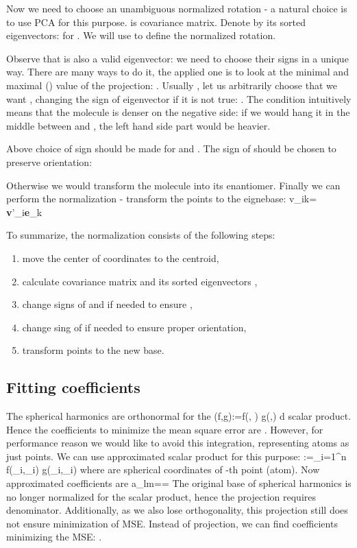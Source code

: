 \documentclass[10pt,journal]{IEEEtranTCOM}
\theoremstyle{plain}
\begin{document}
Now we need to choose an unambiguous normalized rotation - a natural choice is to use PCA for this purpose.  is  covariance matrix. Denote by  its sorted eigenvectors:  for . We will use  to define the normalized rotation.

Observe that  is also a valid eigenvector: we need to choose their signs in a unique way. There are many ways to do it, the applied one is to look at the minimal and maximal () value of the projection: . Usually , let us arbitrarily choose that we want , changing the sign of eigenvector if it is not true: . The  condition intuitively means that the molecule is denser on the negative side: if we would hang it in the middle between  and , the left hand side part would be heavier.

Above choice of sign should be made for  and . The sign of  should be chosen to preserve orientation:

Otherwise we would transform the molecule into its enantiomer. Finally we can perform the normalization - transform the points to the eignebase:
\be v_{ik}= \textbf{v}'_i\cdot \textbf{e}_k\ee

To summarize, the normalization consists of the following steps:
\begin{enumerate}
  \item move the center of coordinates to the centroid,
  \item calculate covariance matrix and its sorted eigenvectors ,
  \item change signs of  and  if needed to ensure ,
  \item change sing of  if needed to ensure proper orientation,
  \item transform points to the new base.
\end{enumerate}

\subsection{Fitting coefficients} \label{fitting}
The spherical harmonics are orthonormal for the
\be (f,g):=\int f(\theta, \varphi) g(\theta,\varphi) d\Omega\ee
scalar product. Hence the coefficients to minimize the mean square error are . However, for performance reason we would like to avoid this integration, representing atoms as just points. We can use approximated scalar product for this purpose:
\be [f,g]:=\sum_{i=1}^n f(\theta_i,\varphi_i) g(\theta_i,\varphi_i)\ee
where  are spherical coordinates of -th point (atom). Now approximated coefficients are
\be a_{lm}=\frac{[r,y_{lm}]}{[y_{lm},y_{lm}]}= \label{proj}\ee
The original base of spherical harmonics is no longer normalized for the  scalar product, hence the projection requires  denominator. Additionally, as we also lose orthogonality, this projection still does not ensure minimization of MSE. Instead of projection, we can find  coefficients minimizing the MSE: .
\end{document}
